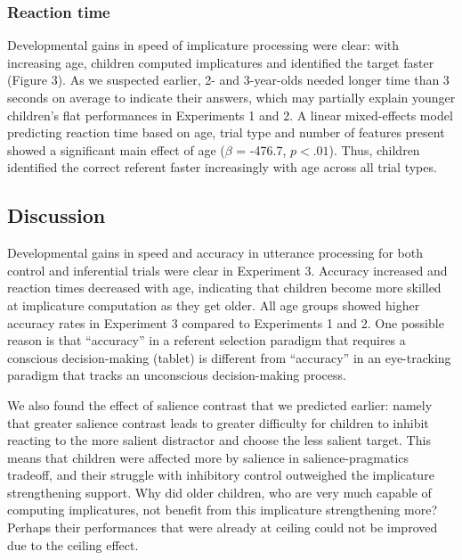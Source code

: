 \documentclass[a4paper,man,apacite,floatsintext]{apa6}
\begin{document}
\subsubsection{Reaction time}\label{reaction-time}

Developmental gains in speed of implicature processing were clear: with
increasing age, children computed implicatures and identified the target
faster (Figure 3). As we suspected earlier, 2- and 3-year-olds needed
longer time than 3 seconds on average to indicate their answers, which
may partially explain younger children's flat performances in
Experiments 1 and 2. A linear mixed-effects model predicting reaction
time based on age, trial type and number of features present showed a
significant main effect of age (\(\beta\) = -476.7, \(p < .01\)). Thus,
children identified the correct referent faster increasingly with age
across all trial types.

\subsection{Discussion}\label{discussion-2}

Developmental gains in speed and accuracy in utterance processing for
both control and inferential trials were clear in Experiment 3. Accuracy
increased and reaction times decreased with age, indicating that
children become more skilled at implicature computation as they get
older. All age groups showed higher accuracy rates in Experiment 3
compared to Experiments 1 and 2. One possible reason is that
``accuracy'' in a referent selection paradigm that requires a conscious
decision-making (tablet) is different from ``accuracy'' in an
eye-tracking paradigm that tracks an unconscious decision-making
process.

We also found the effect of salience contrast that we predicted earlier:
namely that greater salience contrast leads to greater difficulty for
children to inhibit reacting to the more salient distractor and choose
the less salient target. This means that children were affected more by
salience in salience-pragmatics tradeoff, and their struggle with
inhibitory control outweighed the implicature strengthening support. Why
did older children, who are very much capable of computing implicatures,
not benefit from this implicature strengthening more? Perhaps their
performances that were already at ceiling could not be improved due to
the ceiling effect.
\end{document}
